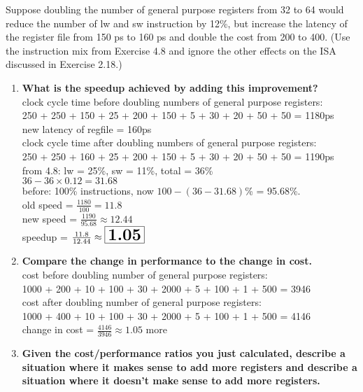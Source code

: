 \documentclass{article}
\begin{document}
    \noindent Suppose doubling the number of general purpose registers from 32 to 64 would reduce the number of lw and sw instruction by 12\%, but increase the latency of the register file from 150 ps to 160 ps and double the cost from 200 to 400. (Use the instruction mix from Exercise 4.8 and ignore the other effects on the ISA discussed in Exercise 2.18.)
    \begin{enumerate}[label=(\alph*)]
        \item \textbf{What is the speedup achieved by adding this improvement?}
        \\ 
        clock cycle time before doubling numbers of general purpose registers:\\
        250 + 250 + 150 + 25 + 200 + 150 + 5 + 30 + 20 + 50 + 50 = 1180ps\\
        new latency of regfile = 160ps\\
        clock cycle time after doubling numbers of general purpose registers:\\
        250 + 250 + 160 + 25 + 200 + 150 + 5 + 30 + 20 + 50 + 50 = 1190ps\\
        from 4.8: lw = 25\%, sw = 11\%, total = 36\%\\
        $36 - 36 \times 0.12 = 31.68$\\
        before: 100\% instructions, now $100 - (36 - 31.68)$\% = 95.68\%.\\
        old speed = $\frac{1180}{100} = 11.8$\\
        new speed = $\frac{1190}{95.68} \approx 12.44$\\
        speedup = $\frac{11.8}{12.44} \approx \boxed{\textbf{\LARGE 1.05}}$
        \item \textbf{Compare the change in performance to the change in cost.}
        \\
        cost before doubling number of general purpose registers:\\
        1000 + 200 + 10 + 100 + 30 + 2000 + 5 + 100 + 1 + 500 = 3946\\
        cost after doubling number of general purpose registers:\\
        1000 + 400 + 10 + 100 + 30 + 2000 + 5 + 100 + 1 + 500 = 4146\\
        change in cost = $\frac{4146}{3946} \approx 1.05$ more\\
        \item \textbf{Given the cost/performance ratios you just calculated, describe a situation where it makes sense to add more registers and describe a situation where it doesn't make sense to add more registers.}
    \end{enumerate}
\end{document}

